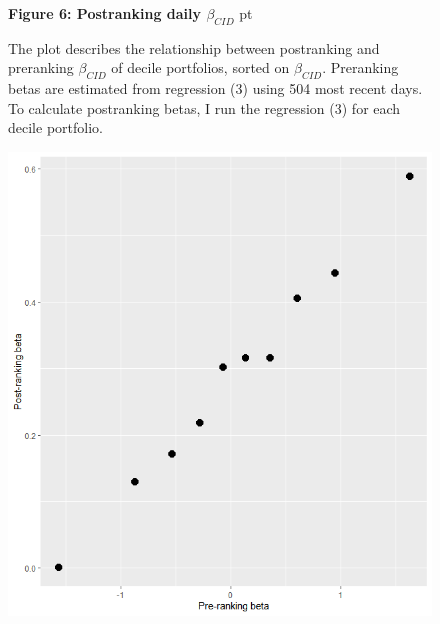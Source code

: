 \documentclass[12pt]{article}
\begin{document}
\begin{figure}
\textbf{Figure 6: Postranking daily $\beta_{CID}$}
 pt
\begin{flushleft}
{The plot describes the relationship between postranking and preranking $\beta_{CID}$ of decile portfolios, sorted on $\beta_{CID}$. Preranking betas are estimated from regression (3) using 504 most recent days. To calculate postranking betas, I run the  regression (3) for each decile portfolio.}
\end{flushleft}
\centering
\includegraphics[width=1\textwidth]{paper_b3/Figure2.png}
\end{figure}

\clearpage
\end{document}
